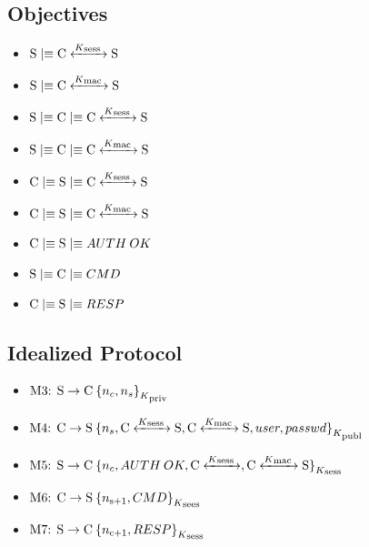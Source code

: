 \subsection{Objectives}
\begin{itemize}
	\item \(\textnormal{S} \mid\equiv \textnormal{C} \xleftrightarrow{K\textsubscript{sess }} \textnormal{S}\)	
	\item \(\textnormal{S} \mid\equiv \textnormal{C} \xleftrightarrow{K\textsubscript{mac }} \textnormal{S}\)
	\item \(\textnormal{S} \mid\equiv \textnormal{C} \mid\equiv \textnormal{C} \xleftrightarrow{K\textsubscript{sess }} \textnormal{S}\)
	\item \(\textnormal{S} \mid\equiv \textnormal{C} \mid\equiv \textnormal{C} \xleftrightarrow{K\textsubscript{mac }} \textnormal{S}\)
	\item \(\textnormal{C} \mid\equiv \textnormal{S} \mid\equiv \textnormal{C} \xleftrightarrow{K\textsubscript{sess }} \textnormal{S}\)
	\item \(\textnormal{C} \mid\equiv \textnormal{S} \mid\equiv \textnormal{C} \xleftrightarrow{K\textsubscript{mac }} \textnormal{S}\)
	\item \(\textnormal{C} \mid\equiv \textnormal{S}\mid\equiv AUTH\:OK\)
	\item \(\textnormal{S} \mid\equiv \textnormal{C}\mid\equiv CMD\)
	\item \(\textnormal{C} \mid\equiv \textnormal{S}\mid\equiv RESP\)
\end{itemize}

\subsection{Idealized Protocol}
\begin{itemize}
	\item \(\textnormal{M3: S} \rightarrow \textnormal{C} \: { \{ n_c,n_s \} }_{K\textsubscript{priv}}\)
	\item \(\textnormal{M4: C} \rightarrow \textnormal{S} \: { \{ n_s,\textnormal{C} \xleftrightarrow{K\textsubscript{sess }} \textnormal{S},\textnormal{C} \xleftrightarrow{K\textsubscript{mac }} \textnormal{S},user,passwd \} }_{K\textsubscript{publ}}\)
	\item \(\textnormal{M5: S} \rightarrow \textnormal{C} \: { \{ n_c,AUTH\:OK, \textnormal{C} \xleftrightarrow{K\textsubscript{sess }},\textnormal{C} \xleftrightarrow{K\textsubscript{mac }} \textnormal{S} \} }_{K\textsubscript{sess}}\)
	\item \(\textnormal{M6: C} \rightarrow \textnormal{S} \: { \{ n\textsubscript{s+1},CMD \} }_{K\textsubscript{sees}}\)
	\item \(\textnormal{M7: S} \rightarrow \textnormal{C} \: { \{ n\textsubscript{c+1},RESP \} }_{K\textsubscript{sess}}\)
\end{itemize}

